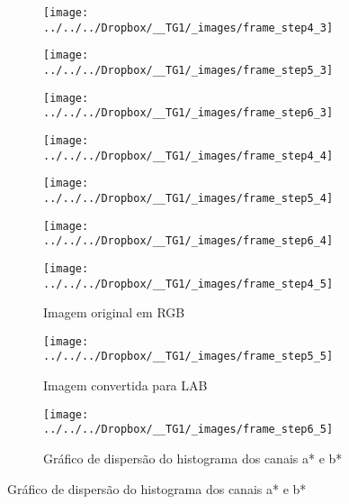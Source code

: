 \documentclass[ecp,tc]{iiufrgs}
\begin{document}
\begin{figure}
	\centering
	\caption{Sequência para cálculo de histograma: Piso}
	\begin{subfigure}[b]{0.3\textwidth}
		\texttt{[image: ../../../Dropbox/\_\_TG1/\_images/frame\_step4\_3]}
		\label{}
	\end{subfigure}
	\quad
	\begin{subfigure}[b]{0.3\textwidth}
		\texttt{[image: ../../../Dropbox/\_\_TG1/\_images/frame\_step5\_3]}
		\label{}
	\end{subfigure}
	\quad
	\begin{subfigure}[b]{0.3\textwidth}
		\texttt{[image: ../../../Dropbox/\_\_TG1/\_images/frame\_step6\_3]}
		\label{}
	\end{subfigure}
	\hfill
	\begin{subfigure}[b]{0.3\textwidth}
		\texttt{[image: ../../../Dropbox/\_\_TG1/\_images/frame\_step4\_4]}
		\label{}
	\end{subfigure}
	\quad
	\begin{subfigure}[b]{0.3\textwidth}
		\texttt{[image: ../../../Dropbox/\_\_TG1/\_images/frame\_step5\_4]}
		\label{}
	\end{subfigure}
	\quad
	\begin{subfigure}[b]{0.3\textwidth}
		\texttt{[image: ../../../Dropbox/\_\_TG1/\_images/frame\_step6\_4]}
		\label{}
	\end{subfigure}
	\hfill
	\begin{subfigure}[b]{0.3\textwidth}
		\texttt{[image: ../../../Dropbox/\_\_TG1/\_images/frame\_step4\_5]}
		\label{}
		\caption{Imagem original em RGB \linebreak}
	\end{subfigure}
	\quad
	\begin{subfigure}[b]{0.3\textwidth}
		\texttt{[image: ../../../Dropbox/\_\_TG1/\_images/frame\_step5\_5]}
		\label{}
		\caption{Imagem convertida para LAB}
	\end{subfigure}
	\quad
	\begin{subfigure}[b]{0.3\textwidth}
		\texttt{[image: ../../../Dropbox/\_\_TG1/\_images/frame\_step6\_5]}
		\label{}
		\caption{Gráfico de dispersão do histograma dos canais a* e b*}
	\end{subfigure}
	\label{fig:histasf}
\end{figure}
\end{document}
